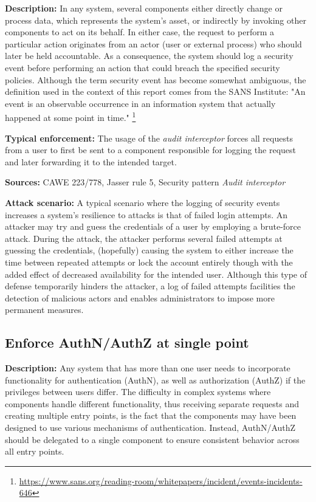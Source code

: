 \textbf{Description:} In any system, several components either directly change or process data, which represents the system's asset, or indirectly by invoking other components to act on its behalf. In either case, the request to perform a particular action originates from an actor (user or external process) who should later be held accountable.  As a consequence, the system should log a security event before performing an action that could breach the specified security policies. Although the term security event has become somewhat ambiguous, the definition used in the context of this report comes from the SANS Institute: "An event is an observable occurrence in an information system that actually happened at some point in time." \footnote{\url{https://www.sans.org/reading-room/whitepapers/incident/events-incidents-646}}

\textbf{Typical enforcement:} The usage of the \textit{audit interceptor} forces all requests from a user to first be sent to a component responsible for logging the request and later forwarding it to the intended target. 

\textbf{Sources:} CAWE 223/778, Jasser rule 5, Security pattern \textit{Audit interceptor}

\textbf{Attack scenario:} A typical scenario where the logging of security events increases a system's resilience to attacks is that of failed login attempts. An attacker may try and guess the credentials of a user by employing a brute-force attack. During the attack, the attacker performs several failed attempts at guessing the credentials, (hopefully) causing the system to either increase the time between repeated attempts or lock the account entirely though with the added effect of decreased availability for the intended user. Although this type of defense temporarily hinders the attacker, a log of failed attempts facilities the detection of malicious actors and enables administrators to impose more permanent measures. 

\subsection{Enforce AuthN/AuthZ at single point}
 
 \textbf{Description:} Any system that has more than one user needs to incorporate functionality for authentication (AuthN), as well as authorization (AuthZ) if the privileges between users differ. The difficulty in complex systems where components handle different functionality, thus receiving separate requests and creating multiple entry points, is the fact that the components may have been designed to use various mechanisms of authentication. Instead, AuthN/AuthZ should be delegated to a single component to ensure consistent behavior across all entry points. 
 
